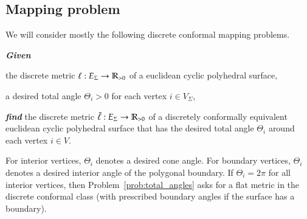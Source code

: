 \documentclass[Thesis.tex]{subfiles}
\begin{document}
\subsection{Mapping problem}
\label{sec:mapping_problem}

We will consider mostly the following discrete conformal mapping problems.
\begin{problem}
\label{prob:total_angles}
\textbf{\itshape{Given}}

\begin{compactitem}
\item the discrete metric $\ell:E_{\Sigma}\rightarrow\mathbb R_{>0}$ of a
euclidean cyclic polyhedral surface,
\item a desired total angle $\Theta_{i}>0$ for each vertex
$i\in V_{\Sigma}$,
\end{compactitem}

\smallskip\noindent%
\textbf{\itshape{find}} the discrete metric
$\tilde\ell:E_{\Sigma}\rightarrow\mathbb R_{>0}$ of a discretely
conformally equivalent euclidean cyclic polyhedral surface that has
the desired total angle $\Theta_{i}$ around each vertex $i\in
V$.
\end{problem}

For interior vertices, $\Theta_i$ denotes a desired cone angle. For
boundary vertices, $\Theta_i$ denotes a desired interior angle of the
polygonal boundary. If $\Theta_{i}=2\pi$ for all interior vertices,
then Problem~\ref{prob:total_angles} asks for a flat metric in the
discrete conformal class (with prescribed boundary angles if the
surface has a boundary).
\end{document}
